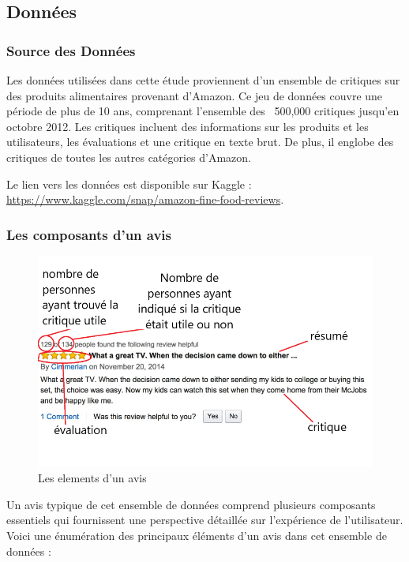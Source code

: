 

\subsection{Données}

\subsubsection{Source des Données}

Les données utilisées dans cette étude proviennent d'un ensemble de critiques sur des produits alimentaires provenant d'Amazon. Ce jeu de données couvre une période de plus de 10 ans, comprenant l'ensemble des ~500,000 critiques jusqu'en octobre 2012. Les critiques incluent des informations sur les produits et les utilisateurs, les évaluations et une critique en texte brut. De plus, il englobe des critiques de toutes les autres catégories d'Amazon.

Le lien vers les données est disponible sur Kaggle :  \url{https://www.kaggle.com/snap/amazon-fine-food-reviews}.

\subsubsection{Les composants d'un avis}
\begin{figure}[h]
    \centering
    \includegraphics[scale=0.5]{assets/amazonReviewDetails.png}
    \caption{Les elements d'un avis}
    \label{fig:avis}
\end{figure}

Un avis typique de cet ensemble de données comprend plusieurs composants essentiels qui fournissent une perspective détaillée sur l'expérience de l'utilisateur. Voici une énumération des principaux éléments d'un avis dans cet ensemble de données :

